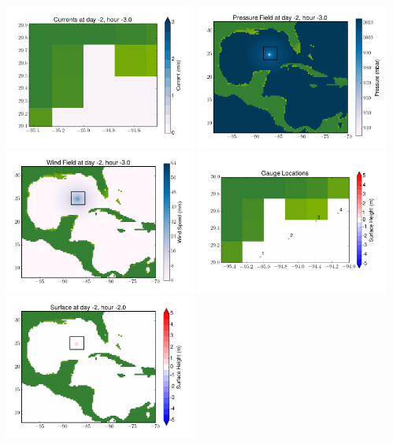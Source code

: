 \documentclass[11pt]{article}
\begin{document}
\vskip 10pt 
\includegraphics[width=0.475\textwidth]{frame0021fig7.png}
\includegraphics[width=0.475\textwidth]{frame0021fig8.png}
\vskip 10pt 
\includegraphics[width=0.475\textwidth]{frame0021fig9.png}
\includegraphics[width=0.475\textwidth]{frame0021fig10.png}
\vskip 10pt 
\includegraphics[width=0.475\textwidth]{frame0022fig1.png}
\end{document}
